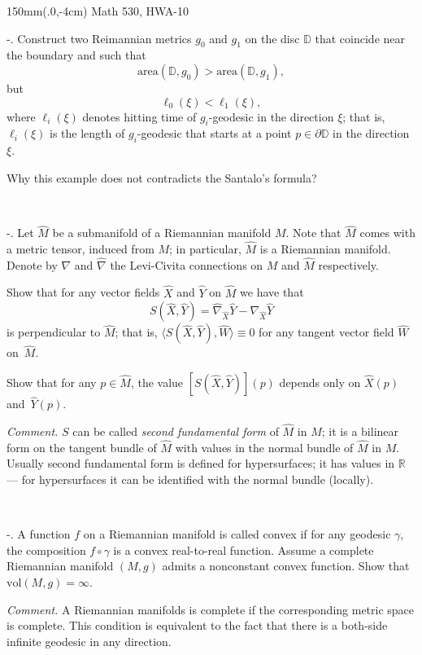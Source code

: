 \documentclass[a4paper,10pt]{article}
\def\DD{\mathbb{D}}%
\def\RR{\mathbb{R}}%
\def\area{\mathrm{area}}%
\def\vol{\mathrm{vol}}%
\begin{document}
\pagestyle{empty}
\begin{textblock*}{150mm}(.0\textwidth,-4cm)
\hfill
Math 530, HWA-10
\end{textblock*}

\vskip-15mm

-. Construct two Reimannian metrics $g_0$ and $g_1$ on the disc $\DD$ that coincide near the boundary and such that 
\[\area (\DD,g_0)>\area (\DD,g_1),\]
but 
\[\ell_0(\xi)<\ell_1(\xi),\]
where $\ell_i(\xi)$ denotes hitting time of $g_i$-geodesic in the direction $\xi$;
that is, 
$\ell_i(\xi)$ is the length of $g_i$-geodesic that starts at a point $p\in \partial \DD$ in the direction $\xi$.

Why this example does not contradicts the Santalo's formula?


\ 

-. Let $\hat M$ be a submanifold of a Riemannian manifold $M$.
Note that $\hat M$ comes with a metric tensor, induced from $M$; in particular, $\hat M$ is a Riemannian manifold.
Denote by $\nabla$ and $\hat\nabla$ the Levi-Civita connections on $M$ and $\hat M$ respectively.

Show that for any vector fields $\hat X$ and $\hat Y$ on $\hat M$ we have that
\[S(\hat X,\hat Y)=\hat\nabla_{\hat X}{\hat Y}-\nabla_{\hat X}{\hat Y}\]
is perpendicular to $\hat M$;
that is, $\langle S(\hat X,\hat Y),\hat W\rangle\equiv0$ for any tangent vector field $\hat W$ on~$\hat M$.

Show that for any $p\in \hat M$, the value $[S(\hat X,\hat Y)](p)$ depends only on $\hat X(p)$ and~$\hat Y(p)$.

\medskip
\noindent\textit{Comment.} $S$ can be called \emph{second fundamental form} of $\hat M$ in $M$;
it is a bilinear form on the tangent bundle of $\hat M$ with values in the normal bundle of $\hat M$ in $M$.
Usually second fundamental form is defined for hypersurfaces; it has values in $\RR$ --- for hypersurfaces it can be identified with the normal bundle (locally).


\ 

-. A function $f$ on a Riemannian manifold is called convex if for any geodesic $\gamma$, the composition $f\circ\gamma$ is a convex real-to-real function.
Assume a complete Riemannian manifold $(M,g)$ admits a nonconstant convex function.
Show that $\vol(M,g)=\infty$.

\medskip
\noindent\textit{Comment.}
A Riemannian manifolds is complete if the corresponding metric space is complete.
This condition is equivalent to the fact that there is a both-side infinite geodesic in any direction.
\end{document}

